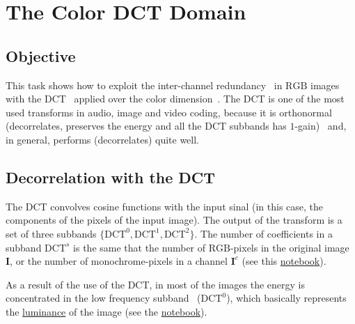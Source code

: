 
\section{The Color DCT Domain}

\subsection{Objective}
This task shows how to exploit the inter-channel
redundancy~\cite{vruiz__visual_redundancy,vruiz__information_theory}
in $\text{RGB}$ images with the DCT~\cite{vruiz__DCT} applied over the
color dimension~\cite{vruiz__image_IO}. The DCT is one of the most
used transforms in audio, image and video coding, because it is
orthonormal (decorrelates, preserves the energy and all the DCT
subbands has $1$-gain)~\cite{vruiz__transform_coding} and, in general,
performs (decorrelates) quite well.

\subsection{Decorrelation with the DCT}
The DCT convolves cosine functions with the input sinal (in this case,
the components of the pixels of the input image). The output of the
transform is a set of three subbands $\{\text{DCT}^0, \text{DCT}^1,
\text{DCT}^2\}$. The number of coefficients in a subband
$\text{DCT}^s$ is the same that the number of $\text{RGB}$-pixels in
the original image $\mathbf{I}$, or the number of monochrome-pixels in
a channel $\mathbf{I}^c$ (see this
\href{https://github.com/Sistemas-Multimedia/Sistemas-Multimedia.github.io/blob/master/contents/RGB_DCT_SQ/RGB_DCT_SQ.ipynb}{notebook}).

As a result of the use of the DCT, in most of the images the energy is
concentrated in the low frequency
subband~\cite{vruiz__transform_coding} ($\text{DCT}^0$), which
basically represents the
\href{https://en.wikipedia.org/wiki/Luminance}{luminance} of the
image (see the \href{https://github.com/Sistemas-Multimedia/Sistemas-Multimedia.github.io/blob/master/contents/RGB_DCT_SQ/RGB_DCT_SQ.ipynb}{notebook}).

